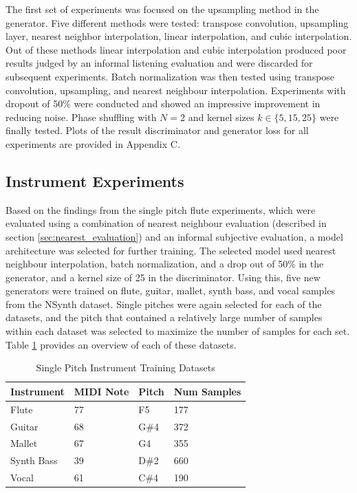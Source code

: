 The first set of experiments was focused on the upsampling method in the generator. Five different methods were tested: transpose convolution, upsampling layer, nearest neighbor interpolation, linear interpolation, and cubic interpolation. Out of these methods linear interpolation and cubic interpolation produced poor results judged by an informal listening evaluation and were discarded for subsequent experiments. Batch normalization was then tested using transpose convolution, upsampling, and nearest neighbour interpolation. Experiments with dropout of 50\% were conducted and showed an impressive improvement in reducing noise. Phase shuffling with $N=2$ and kernel sizes $k \in \{5,15,25\}$ were finally tested. Plots of the result discriminator and generator loss for all experiments are provided in Appendix C.

\subsection{Instrument Experiments}
Based on the findings from the single pitch flute experiments, which were evaluated using a combination of nearest neighbour evaluation (described in section \ref{sec:nearest_evaluation}) and an informal subjective evaluation, a model architecture was selected for further training. The selected model used nearest neighbour interpolation, batch normalization, and a drop out of 50\% in the generator, and a kernel size of 25 in the discriminator. Using this, five new generators were trained on flute, guitar, mallet, synth bass, and vocal samples from the NSynth dataset. Single pitches were again selected for each of the datasets, and the pitch that contained a relatively large number of samples within each dataset was selected to maximize the number of samples for each set. Table \ref{tab:single_inst} provides an overview of each of these datasets.

\begin{table}[t]
    \caption{Single Pitch Instrument Training Datasets}
    \label{tab:single_inst}
    \centering
    \begin{tabular}{llll}
        \toprule
        Instrument& MIDI Note& Pitch& Num Samples\\
        \midrule
        Flute&      77&     F5&     177\\
        Guitar&     68&     G\#4&   372\\
        Mallet&     67&     G4&     355\\
        Synth Bass& 39&     D\#2&   660\\
        Vocal&      61&     C\#4&   190\\
        \bottomrule
    \end{tabular}

\end{table}



